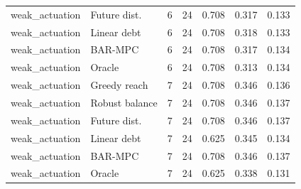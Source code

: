 \begin{longtable}{llrrrrr}
weak\_actuation & Future dist. & 6 & 24 & 0.708 & 0.317 & 0.133 \\
weak\_actuation & Linear debt & 6 & 24 & 0.708 & 0.318 & 0.133 \\
weak\_actuation & BAR-MPC & 6 & 24 & 0.708 & 0.317 & 0.134 \\
weak\_actuation & Oracle & 6 & 24 & 0.708 & 0.313 & 0.134 \\
weak\_actuation & Greedy reach & 7 & 24 & 0.708 & 0.346 & 0.136 \\
weak\_actuation & Robust balance & 7 & 24 & 0.708 & 0.346 & 0.137 \\
weak\_actuation & Future dist. & 7 & 24 & 0.708 & 0.346 & 0.137 \\
weak\_actuation & Linear debt & 7 & 24 & 0.625 & 0.345 & 0.134 \\
weak\_actuation & BAR-MPC & 7 & 24 & 0.708 & 0.346 & 0.137 \\
weak\_actuation & Oracle & 7 & 24 & 0.625 & 0.338 & 0.131 \\
\bottomrule
\end{longtable}

